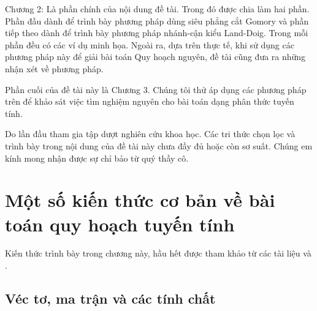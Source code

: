 \documentclass[12pt,a4paper]{report}
\begin{document}
Chương 2: Là phần chính của nội dung đề tài. Trong đó được chia làm hai phần. Phần đầu dành để trình bày phương pháp dùng siêu phẳng cắt Gomory và phần tiếp theo dành để trình bày phương pháp nhánh-cận kiểu Land-Doig. Trong mỗi phần đều có các ví dụ minh họa. Ngoài ra, dựa trên thực tế, khi sử dụng các phương pháp này để giải bài toán Quy hoạch nguyên, đề tài cũng đưa ra những nhận xét về phương pháp.

Phần cuối của đề tài này là Chương 3. Chúng tôi thử áp dụng các phương pháp trên để khảo sát việc tìm nghiệm nguyên cho bài toán dạng phân thức tuyến tính. 

Do lần đầu tham gia tập dượt nghiên cứu khoa học. Các tri thức chọn lọc và trình bày trong nội dung của đề tài này chưa đầy đủ hoặc còn sơ suất. Chúng em kính mong nhận được sự chỉ bảo từ quý thầy cô.

\newpage
\renewcommand{\baselinestretch}{1.2}
 
\chapter{Một số kiến thức cơ bản về bài toán quy hoạch tuyến tính} 
Kiến thức trình bày trong chương này, hầu hết được tham khảo từ các tài liệu  \cite{xxx} và \cite{xxx}.
\section{ Véc tơ, ma trận và các tính chất}
\end{document}
